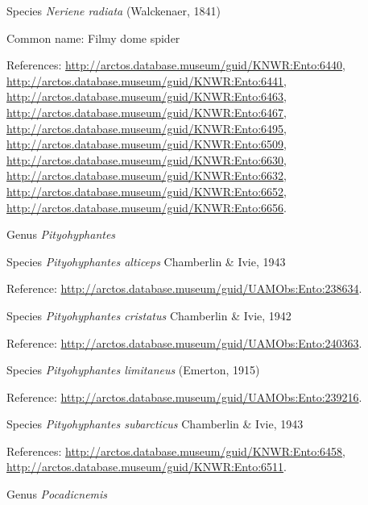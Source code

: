 \documentclass[9pt, article]{memoir}
\begin{document}
\begin{multicols}{2}
\vspace{6pt}\noindent\hspace{36pt}Species \textit{Neriene radiata} (Walckenaer, 1841)


Common name: Filmy dome spider

References: 
\url{http://arctos.database.museum/guid/KNWR:Ento:6440}, 
\url{http://arctos.database.museum/guid/KNWR:Ento:6441}, 
\url{http://arctos.database.museum/guid/KNWR:Ento:6463}, 
\url{http://arctos.database.museum/guid/KNWR:Ento:6467}, 
\url{http://arctos.database.museum/guid/KNWR:Ento:6495}, 
\url{http://arctos.database.museum/guid/KNWR:Ento:6509}, 
\url{http://arctos.database.museum/guid/KNWR:Ento:6630}, 
\url{http://arctos.database.museum/guid/KNWR:Ento:6632}, 
\url{http://arctos.database.museum/guid/KNWR:Ento:6652}, 
\url{http://arctos.database.museum/guid/KNWR:Ento:6656}.

\vspace{6pt}\noindent\hspace{30pt}Genus \textit{Pityohyphantes}


\vspace{6pt}\noindent\hspace{36pt}Species \textit{Pityohyphantes alticeps} Chamberlin \& Ivie, 1943


Reference: 
\url{http://arctos.database.museum/guid/UAMObs:Ento:238634}.

\vspace{6pt}\noindent\hspace{36pt}Species \textit{Pityohyphantes cristatus} Chamberlin \& Ivie, 1942


Reference: 
\url{http://arctos.database.museum/guid/UAMObs:Ento:240363}.

\vspace{6pt}\noindent\hspace{36pt}Species \textit{Pityohyphantes limitaneus} (Emerton, 1915)


Reference: 
\url{http://arctos.database.museum/guid/UAMObs:Ento:239216}.

\vspace{6pt}\noindent\hspace{36pt}Species \textit{Pityohyphantes subarcticus} Chamberlin \& Ivie, 1943


References: 
\url{http://arctos.database.museum/guid/KNWR:Ento:6458}, 
\url{http://arctos.database.museum/guid/KNWR:Ento:6511}.

\vspace{6pt}\noindent\hspace{30pt}Genus \textit{Pocadicnemis}



\end{multicols}
\end{document}
